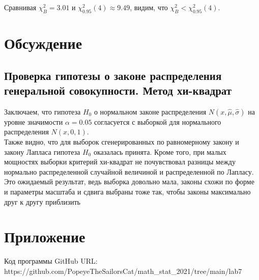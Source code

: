 \documentclass{article}
\begin{document}
\noindent Сравнивая $\chi^{2}_{B} = 3.01$ и $\chi^{2}_{0.95}(4) \approx 9.49$, видим, что $\chi^{2}_{B} < \chi^{2}_{0.95}(4)$.

\section{Обсуждение}
\subsection{Проверка гипотезы о законе распределения генеральной совокупности. Метод хи-квадрат}
	
\noindent Заключаем, что гипотеза $H_{0}$ о нормальном законе распределения $N(x,\hat{\mu}, \hat{\sigma})$ на уровне значимости $\alpha = 0.05$ согласуется с выборкой для нормального распределения $N(x, 0, 1)$.
\\
Также видно, что для выборок сгенерированных по равномерному закону и закону Лапласа гипотеза $H_{0}$ оказалась принята. Кроме того, при малых мощностях выборки критерий хи-квадрат не почувствовал разницы между нормально распределенной случайной величиной и распределенной по Лапласу. Это ожидаемый результат,
ведь выборка довольно мала, законы схожи по форме и параметры
масштаба и сдвига выбраны тоже так, чтобы законы максимально
друг к другу приблизить

\section{Приложение}
\noindent Код программы GitHub URL:\\ https://github.com/PopeyeTheSailorsCat/math\_stat\_2021/tree/main/lab7
\newline 
\end{document}
